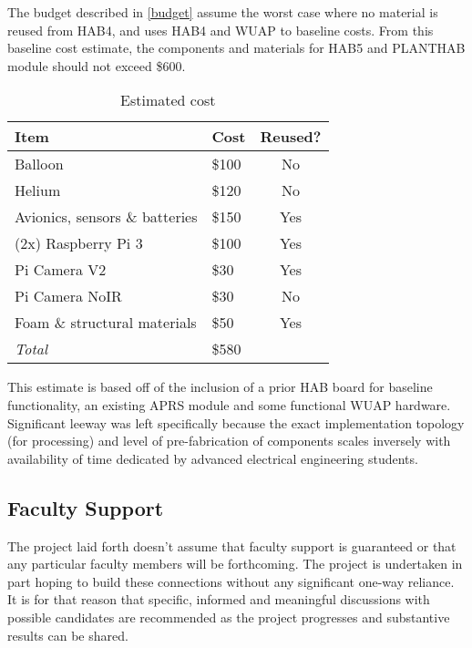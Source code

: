 \documentclass[conference]{IEEEtran} %
\begin{document}
The budget described in \autoref{budget} assume the worst case where no material is reused from HAB4, and uses HAB4 and WUAP to baseline costs.
From this baseline cost estimate, the components and materials for HAB5 and PLANTHAB module should not exceed \$600.

\begin{table}[ht]
  \caption{Estimated cost}
  \centering
  \begin{tabular}{@{}llc@{}}
    \label{budget}
    \textbf{Item} & \textbf{Cost} & \textbf{Reused?} \\
    \midrule
    Balloon & \$100 & No \\
    Helium & \$120 & No\\
    Avionics, sensors \& batteries & \$150 & Yes\\
    (2x) Raspberry Pi 3 & \$100 & Yes\\
    Pi Camera V2 & \$30 & Yes \\
    Pi Camera NoIR & \$30 & No \\
    Foam \& structural materials & \$50 & Yes \\
    \midrule
    \textit{Total} & \$580 & \\
  \end{tabular}
\end{table}

This estimate is based off of the inclusion of a prior HAB board for baseline functionality, an existing APRS module and some functional WUAP hardware.
Significant leeway was left specifically because the exact implementation topology (for processing) and level of pre-fabrication of components scales inversely with availability of time dedicated by advanced electrical engineering students.

\subsection{Faculty Support}
The project laid forth doesn't assume that faculty support is guaranteed or that any particular faculty members will be forthcoming.
The project is undertaken in part hoping to build these connections without any significant one-way reliance.
It is for that reason that specific, informed and meaningful discussions with possible candidates are recommended as the project progresses and substantive results can be shared.
\end{document}
